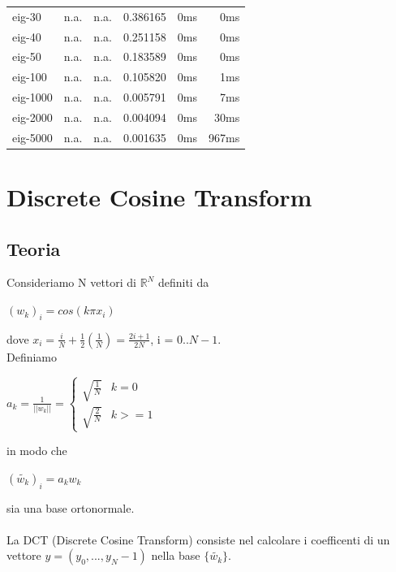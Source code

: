 \documentclass[12pt]{article}
\begin{document}
\begin{table}[h]
\begin{center}
\begin{tabular}{|l|r|r|r|r|r|}
      eig-30 &	            n.a. &	              n.a. &           0.386165 & 	0ms		 &			0ms   \\
      eig-40 &	            n.a. &	              n.a. &           0.251158 & 	0ms		 &			0ms   \\
      eig-50 &	            n.a. &	              n.a. &           0.183589 & 	0ms		 &			0ms   \\
     eig-100 &	            n.a. &	              n.a. &           0.105820 & 	0ms		 &			1ms   \\
    eig-1000 &	            n.a. &	              n.a. &           0.005791 & 	0ms		 &			7ms   \\
    eig-2000 &	            n.a. &	              n.a. &           0.004094 & 	0ms		&			30ms  \\
    eig-5000 &	            n.a. &	              n.a. &           0.001635 &	0ms		&			967ms \\
\hline
\end{tabular}
\end{center}
\end{table}

\newpage
\section{Discrete Cosine Transform}
\subsection{Teoria}
Consideriamo N vettori di $\mathbb{R}^N$ definiti da 
\begin{center} $(w_k)_i = cos(k{\pi}x_i)$ \end{center}
dove $x_i = \frac{i}{N} + \frac{1}{2}(\frac{1}{N}) = \frac{2i+1}{2N}$, i = $0..N-1$.\\
Definiamo
\begin{center} $a_k = \frac{1}{||w_k||} = \left\{ \begin{array}{ll} \sqrt{\frac{1}{N}} & k=0\\ \sqrt{\frac{2}{N}} & k >= 1\end{array}\right.$ \end{center}
in modo che 
\begin{center} $(\tilde{w_k})_i = a_kw_k$ \end{center}
sia una base ortonormale. \\\\
La DCT (Discrete Cosine Transform) consiste nel calcolare i coefficenti di un vettore $y = (y_0,...,y_N-1)$ nella base $\{\tilde{w_k}\}$.
\end{document}
